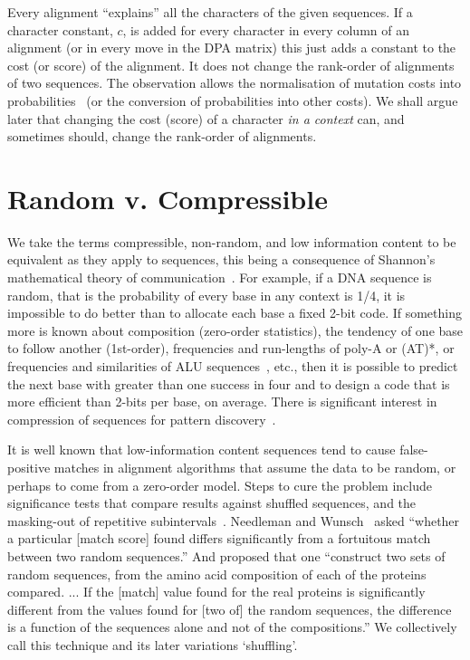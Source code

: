 \documentclass[a4paper,11pt,oneside]{article}
\begin{document}
Every alignment ``explains'' all the characters of the given sequences.
If a character constant, $c$, is added for every character
in every column of an alignment (or in every move in the DPA matrix)
this just adds a constant to the cost (or score) of the alignment.
It does not change the rank-order of alignments of two sequences.
The observation allows the normalisation of mutation costs into
probabilities~\cite{allison93a} (or the conversion of probabilities into other costs).
We shall argue later that changing the cost (score) of a character
{\em in a context} can, and sometimes should, change the rank-order
of alignments.


\section{Random v. Compressible}

We take the terms compressible, non-random, and low information content
to be equivalent as they apply to sequences, this being a consequence of
Shannon's mathematical theory of communication~\cite{shannon48}.
For example, if a DNA sequence is random, that is the probability of every
base in any context is 1/4, it is impossible to do better than to allocate
each base a fixed 2-bit code.
If something more is known about composition (zero-order statistics),
the tendency of one base to follow another (1st-order),
frequencies and run-lengths of poly-A or (AT)*, or
frequencies and similarities of ALU sequences~\cite{herzel94}, etc.,
then it is possible to predict the next base with greater than one success
in four and to design a code that is more efficient than 2-bits per base,
on average.  There is significant interest in compression of sequences for
pattern discovery~\cite{grumbach94, loewenstern97, rivals97, allison00a, stern01}.

It is well known that low-information content sequences tend to cause
false-positive matches in alignment algorithms that assume
the data to be random, or perhaps to come from a zero-order model.
Steps to cure the problem include
significance tests that compare results against shuffled sequences, and
the masking-out of repetitive subintervals~\cite{wootton93}.
Needleman and Wunsch~\cite{needleman70}
asked ``whether a particular [match score] found differs significantly
from a fortuitous match between two random sequences.''
And proposed that one ``construct two sets of random sequences,
from the amino acid composition of each of the proteins compared. ...
If the [match] value found for the real proteins is significantly different
from the values found for [two of] the random sequences,
the difference is a function of the sequences alone and
not of the compositions.''
We collectively call this technique and its later variations `shuffling'.
\end{document}
